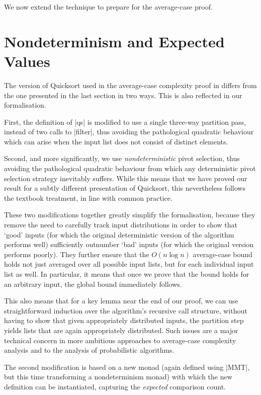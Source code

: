 \documentclass[runningheads]{llncs}
\begin{document}
We now extend the technique to prepare for the average-case proof.

\section{Nondeterminism and Expected Values}
\label{nondetexpec}


The version of Quicksort used in the average-case complexity proof in \cite{introtoalgos}
differs from the one presented in the last section in two ways. This is also
reflected in our formalisation.  

First, the definition of |qs| is modified to use a single three-way partition
pass, instead of two calls to |filter|, thus avoiding the pathological
quadratic behaviour which can arise when the input list does not consist of
distinct elements.

Second, and more significantly, we use \emph{nondeterministic} pivot
selection, thus avoiding the pathological quadratic behaviour from which
any deterministic pivot selection strategy inevitably suffers. While this
means that we have proved our result for a subtly different presentation of
Quicksort, this nevertheless follows the textbook treatment, in line with
common practice.

These two modifications together greatly simplify the formalisation, because
they remove the need to carefully track input distributions in order to show
that `good' inputs (for which the original deterministic version of the
algorithm performs well) sufficiently outnumber `bad' inputs (for which the
original version performs poorly). They further ensure that the $O(n \log n)$
average-case bound holds not just averaged over all possible input lists, but
for each individual input list as well. In particular, it means that once we
prove that the bound holds for an arbitrary input, the global bound
immediately follows.

This also means that for a key lemma near the end of our proof, we can use
straightforward induction over the algorithm's recursive call structure,
without having to show that given appropriately distributed inputs, the
partition step yields lists that are again appropriately distributed. Such
issues are a major technical concern in more ambitious approaches to
average-case complexity analysis \cite[for example]{modularcalculus} and to
the analysis of probabilistic algorithms.

The second modification is based on a new monad (again defined using |MMT|,
but this time transforming a nondeterminism monad) with which the new
definition can be instantiated, capturing the \emph{expected} comparison
count.
\end{document}
